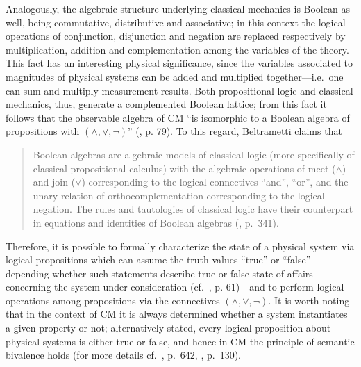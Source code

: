 \documentclass[11pt, executivepaper]{article}
\begin{document}
Analogously, the algebraic structure underlying classical mechanics is Boolean as well, being commutative, distributive and associative; in this context the logical operations of conjunction, disjunction and negation are replaced respectively by multiplication, addition and complementation among the variables of the theory. This fact has an interesting physical significance, since the variables associated to magnitudes of physical systems can be added and multiplied together---i.e.\ one can sum and multiply measurement results. Both propositional logic and classical mechanics, thus, generate a complemented Boolean lattice; from this fact it follows that the observable algebra of CM ``is isomorphic to a Boolean algebra of propositions with $(\wedge, \vee, \neg)$'' (\cite{David:2015}, p. 79).
To this regard, Beltrametti claims that 
\begin{quote}
Boolean algebras are algebraic models of classical logic (more specifically of classical propositional calculus) with the algebraic operations of meet ($\wedge$) and join ($\vee$) corresponding to the logical connectives ``and'', ``or'', and the unary relation of orthocomplementation corresponding to the logical negation. The rules and tautologies of classical logic have their counterpart in equations and identities of Boolean algebras (\cite{Beltrametti:2004}, p.\ 341). 
\end{quote}

Therefore, it is possible to formally characterize the state of a physical system via logical propositions which can assume the truth values ``true'' or ``false''---depending whether such statements describe true or false state of affairs concerning the system under consideration (cf.\ \cite{Jaeger:2009}, p. 61)---and to perform logical operations among propositions via the connectives $(\wedge, \vee, \neg)$. It is worth noting that in the context of CM it is always determined whether a system instantiates a given property or not; alternatively stated, every logical proposition about physical systems is either true or false, and hence in CM the principle of semantic bivalence holds (for more details cf.\ \cite{Bub:2007}, p.\ 642, \cite{Giuntini:2002}, p.\ 130).
 
\end{document}
